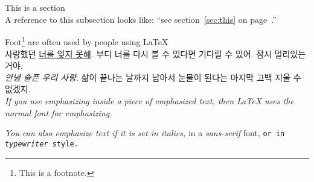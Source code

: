 \documentclass[a4paper, 11pt]{article}
\begin{document}
\section{}
This is a section
\\



A reference to this subsection 
\label{sec:this} looks like:
``see section~\ref{sec:this} on
page~\pageref{sec:this}.''




Foot\footnote{This is a footnote.}
are often used by people using \LaTeX
\\



사랑했던 \underline{너를 잊지 못해}. 부디 너를 다시 볼 수 있다면 기다릴 수 있어. 잠시 멀리있는 거야.\\
\emph{안녕 슬픈 우리 사랑}. 삶이 끝나는 날까지 남아서 눈물이 된다는 마지막 고백 지울 수 없겠지.
\\

\emph{If you use emphasizing inside a piece of emphasized text, then \LaTeX{} uses the
\emph{normal} font for emphasizing.}



\textit{You can also 
  \emph{emphasize} text if it is set in italics,}
\textsf{in a
  \emph{sans-serif} font,}
\texttt{or in
  \emph{typewriter} style.}
\end{document}
